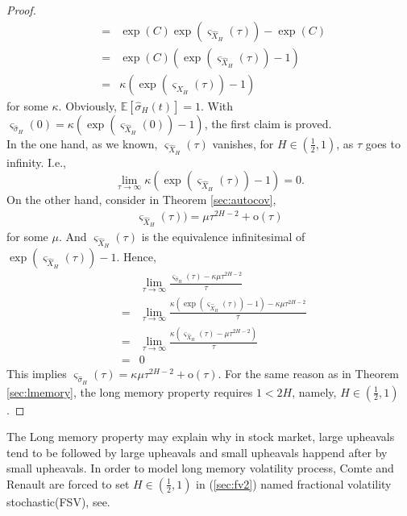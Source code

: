 \documentclass[a4paper, twoside, 11pt]{article}
\theoremstyle{definition}
\begin{document}
\begin{proof}
\begin{eqnarray*}
	&=& \exp(C) \exp(\varsigma_{\hat{X}_{H}}(\tau)) - \exp(C)\\
	&=& \exp(C)(\exp(\varsigma_{\hat{X}_{H}}(\tau)) - 1)\\
	&=& \kappa(\exp(\varsigma_{\hat{X}_{H}}(\tau)) - 1)
 \end{eqnarray*}
 for some $\kappa$. Obviously, $\mathbb{E}[\hat{\sigma}_{H}(t)]=1$. With $ \varsigma_{\hat{\sigma}_H}(0) = \kappa(\exp(\varsigma_{\hat{X}_{H}}(0)) - 1)$, the first claim is proved.\\
 In the one hand, as we known, $\varsigma_{\hat{X}_{H}}(\tau)$ vanishes, for $H\in(\frac{1}{2}, 1)$, as $\tau$ goes to infinity. I.e.,
 $$
 \lim\limits_{\tau\rightarrow \infty}\kappa(\exp(\varsigma_{\hat{X}_{H}}(\tau)) - 1) = 0.
 $$
 On the other hand, consider in Theorem \ref{sec:autocov},
\begin{eqnarray*}
  \varsigma_{\hat{X}_{H}}(\tau)) = \mu \tau^{2H-2} + \mathrm{o}(\tau)
\end{eqnarray*}
for some $\mu$.
And $\varsigma_{\hat{X}_{H}}(\tau)$ is the equivalence infinitesimal of $\exp(\varsigma_{\hat{X}_{H}}(\tau)) - 1$. Hence,
\begin{eqnarray*}
  &&  \lim\limits_{\tau\rightarrow \infty} \frac{\varsigma_{\hat{\sigma}_H}(\tau) - \kappa \mu \tau^{2H-2}}{\tau}\\
  &=& \lim\limits_{\tau\rightarrow \infty}\frac{\kappa(\exp(\varsigma_{\hat{X}_{H}}(\tau)) - 1) - \kappa \mu \tau^{2H-2}}{\tau}\\
  &=& \lim\limits_{\tau\rightarrow \infty}\frac{\kappa(\varsigma_{\hat{X}_{H}}(\tau) - \mu\tau^{2H-2})}{\tau}\\
  &=& 0
\end{eqnarray*}
This implies $\varsigma_{\hat{\sigma}_H}(\tau) = \kappa\mu \tau^{2H-2} + \mathrm{o}(\tau)$. For the same reason as in Theorem \ref{sec:lmemory}, the long memory property requires $1<2H$, namely, $H\in(\frac{1}{2}, 1)$.
\end{proof}

The Long memory property may explain why in stock market, large upheavals tend to be followed by large upheavals and small upheavals happend after by small upheavals.  In order to model long memory volatility process, Comte and Renault are forced to set $H\in (\frac{1}{2}, 1)$ in (\ref{sec:fv2}) named fractional volatility stochastic(FSV), see\cite{comren}. \\
\end{document}
